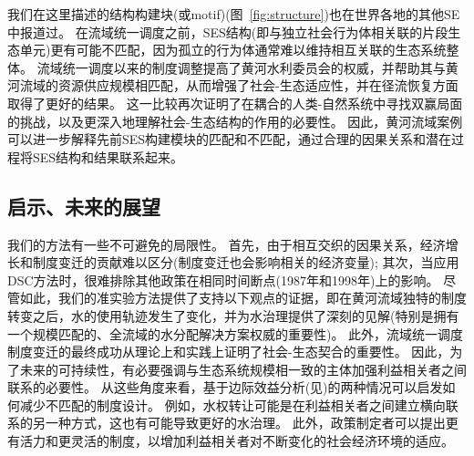 我们在这里描述的结构构建块(或motif)(图~\ref{fig:structure})也在世界各地的其他SE中报道过。
在流域统一调度之前，SES结构(即与独立社会行为体相关联的片段生态单元)更有可能不匹配，因为孤立的行为体通常难以维持相互关联的生态系统整体\cite{sayles2017,sayles2019,cai2016,bergsten2019}。
流域统一调度以来的制度调整提高了黄河水利委员会的权威，并帮助其与黄河流域的资源供应规模相匹配，从而增强了社会-生态适应性，并在径流恢复方面取得了更好的结果\cite{cumming2020a,wang2019d}。
这一比较再次证明了在耦合的人类-自然系统\cite{hegwood2022}中寻找双赢局面的挑战，以及更深入地理解社会-生态结构\cite{bergsten2019, sayles2019}的作用的必要性。
因此，黄河流域案例可以进一步解释先前SES构建模块的匹配和不匹配，通过合理的因果关系和潜在过程将SES结构和结果联系起来。



\subsection{启示、未来的展望}

我们的方法有一些不可避免的局限性。
首先，由于相互交织的因果关系，经济增长和制度变迁的贡献难以区分(制度变迁也会影响相关的经济变量);
其次，当应用DSC方法时，很难排除其他政策在相同时间断点(1987年和1998年)上的影响。
尽管如此，我们的准实验方法提供了支持以下观点的证据，即在黄河流域独特的制度转变之后，水的使用轨迹发生了变化，并为水治理提供了深刻的见解(特别是拥有一个规模匹配的、全流域的水分配解决方案权威的重要性\cite{bodin2017b, ostrom2009, reyers2018})。
此外，流域统一调度制度变迁的最终成功从理论上和实践上证明了社会-生态契合的重要性。
因此，为了未来的可持续性，有必要强调与生态系统规模相一致的主体加强利益相关者之间联系的必要性。
从这些角度来看，基于边际效益分析(见\textit{})的两种情况可以启发如何减少不匹配的制度设计。
例如，水权转让可能是在利益相关者之间建立横向联系的另一种方式，这也有可能导致更好的水治理。
此外，政策制定者可以提出更有活力和更灵活的制度，以增加利益相关者对不断变化的社会经济环境的适应\cite{reyers2018}。

